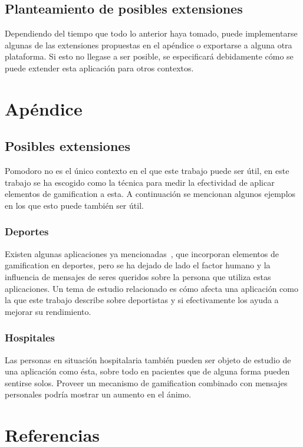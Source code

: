 \documentclass[12pt,letterpaper]{report}
\begin{document}
\hypertarget{planteamiento-de-posibles-extensiones}{%
\subsection{Planteamiento de posibles
extensiones}\label{planteamiento-de-posibles-extensiones}}

Dependiendo del tiempo que todo lo anterior haya tomado, puede
implementarse algunas de las extensiones propuestas en el apéndice o
exportarse a alguna otra plataforma. Si esto no llegase a ser posible,
se especificará debidamente cómo se puede extender esta aplicación para
otros contextos.

\newpage
\section{Apéndice}\label{sec:apendice}

\subsection{Posibles extensiones}\label{subsec:posibles-extensiones}

Pomodoro no es el único contexto en el que este trabajo puede ser
útil, en este trabajo se ha escogido como la técnica para medir la
efectividad de aplicar elementos de gamification a esta. A
continuación se mencionan algunos ejemplos en los que esto puede
también ser útil.

\subsubsection{Deportes}

Existen algunas aplicaciones ya mencionadas~\cite{zombiesrun},
que incorporan elementos de gamification en deportes, pero se ha
dejado de lado el factor humano y la influencia de mensajes de seres
queridos sobre la persona que utiliza estas aplicaciones. Un tema de
estudio relacionado es cómo afecta una aplicación como la que este
trabajo describe sobre deportistas y si efectivamente los ayuda a
mejorar su rendimiento.

\subsubsection{Hospitales}

Las personas en situación hospitalaria también pueden ser objeto de
estudio de una aplicación como ésta, sobre todo en pacientes que de
alguna forma pueden sentirse solos. Proveer un mecanismo de
gamification combinado con mensajes personales podría mostrar un
aumento en el ánimo.

\newpage
\section{Referencias}
\printbibliography[heading=none]
\end{document}
